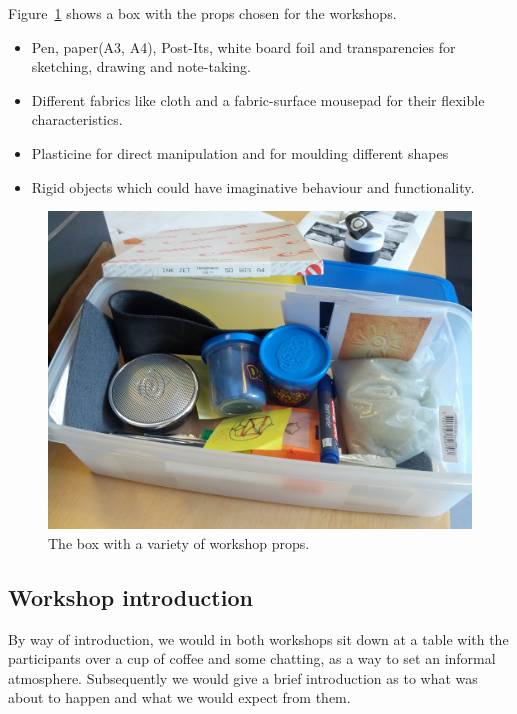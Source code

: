 Figure~\ref{ch:workshops:props-box} shows a box with the props chosen for the workshops.

\begin{itemize}
  \item{Pen, paper(A3, A4), Post-Its, white board foil and transparencies for sketching, drawing and note-taking.}
  \item{Different fabrics like cloth and a fabric-surface mousepad for their flexible characteristics.}
  \item{Plasticine for direct manipulation and for moulding different shapes}
  \item{Rigid objects which could have imaginative behaviour and functionality.}
\end{itemize}

\begin{figure}[hb]
  \centering
    \includegraphics[width=.9\textwidth]{workshops/props-box}
    \caption[A box with a variety of workshop props.] %
  {The box with a variety of workshop props.} %
  \label{ch:workshops:props-box}
\end{figure}

\subsection{Workshop introduction}
\label{ch:workshops:approach:introduction}
By way of introduction, we would in both workshops sit down at a table with the participants over a cup of coffee and some chatting, as a way to set an informal atmosphere.
Subsequently we would give a brief introduction as to what was about to happen and what we would expect from them.

